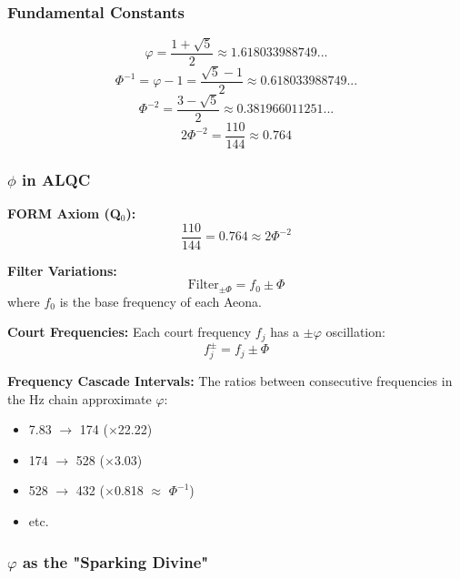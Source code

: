 \documentclass[11pt, letterpaper]{article}
\begin{document}
\subsubsection{Fundamental Constants}

\begin{equation}
\varphi = \frac{1 + \sqrt{5}}{2} \approx 1.618033988749...
\end{equation}
\begin{equation}
\Phi^{-1} = \varphi - 1 = \frac{\sqrt{5} - 1}{2} \approx 0.618033988749...
\end{equation}
\begin{equation}
\Phi^{-2} = \frac{3 - \sqrt{5}}{2} \approx 0.381966011251...
\end{equation}
\begin{equation}
2\Phi^{-2} = \frac{110}{144} \approx 0.764
\end{equation}

\subsubsection{\texorpdfstring{$\phi$ in ALQC}{phi in ALQC}}

\textbf{FORM Axiom (Q$_0$):}
\begin{equation}
\frac{110}{144} = 0.764 \approx 2\Phi^{-2}
\end{equation}

\textbf{Filter Variations:}
\begin{equation}
\text{Filter}_{\pm\Phi} = f_0 \pm \Phi
\end{equation}
where $f_0$ is the base frequency of each Aeona.

\textbf{Court Frequencies:}
Each court frequency $f_j$ has a $\pm\varphi$ oscillation:
\begin{equation}
f_j^{\pm} = f_j \pm \Phi
\end{equation}

\textbf{Frequency Cascade Intervals:}
The ratios between consecutive frequencies in the Hz chain approximate $\varphi$:
\begin{itemize}
    \item 7.83 $\to$ 174 ($\times$22.22)
    \item 174 $\to$ 528 ($\times$3.03)
    \item 528 $\to$ 432 ($\times$0.818 $\approx$ $\Phi^{-1}$)
    \item etc.
\end{itemize}

\subsubsection{\texorpdfstring{$\varphi$ as the "Sparking Divine"}{varphi as the "Sparking Divine"}}
\end{document}
